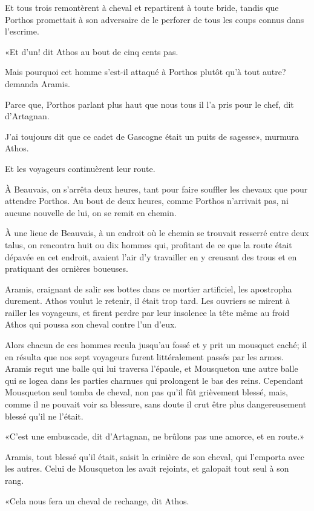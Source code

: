 Et tous trois remontèrent à cheval et repartirent à toute bride, tandis que Porthos promettait à son adversaire de le perforer de tous les coups connus dans l'escrime. 

«Et d'un! dit Athos au bout de cinq cents pas. 

\speak  Mais pourquoi cet homme s'est-il attaqué à Porthos plutôt qu'à tout autre? demanda Aramis. 

\speak  Parce que, Porthos parlant plus haut que nous tous il l'a pris pour le chef, dit d'Artagnan. 

\speak  J'ai toujours dit que ce cadet de Gascogne était un puits de sagesse», murmura Athos. 

Et les voyageurs continuèrent leur route. 

À Beauvais, on s'arrêta deux heures, tant pour faire souffler les chevaux que pour attendre Porthos. Au bout de deux heures, comme Porthos n'arrivait pas, ni aucune nouvelle de lui, on se remit en chemin. 

À une lieue de Beauvais, à un endroit où le chemin se trouvait resserré entre deux talus, on rencontra huit ou dix hommes qui, profitant de ce que la route était dépavée en cet endroit, avaient l'air d'y travailler en y creusant des trous et en pratiquant des ornières boueuses. 

Aramis, craignant de salir ses bottes dans ce mortier artificiel, les apostropha durement. Athos voulut le retenir, il était trop tard. Les ouvriers se mirent à railler les voyageurs, et firent perdre par leur insolence la tête même au froid Athos qui poussa son cheval contre l'un d'eux. 

Alors chacun de ces hommes recula jusqu'au fossé et y prit un mousquet caché; il en résulta que nos sept voyageurs furent littéralement passés par les armes. Aramis reçut une balle qui lui traversa l'épaule, et Mousqueton une autre balle qui se logea dans les parties charnues qui prolongent le bas des reins. Cependant Mousqueton seul tomba de cheval, non pas qu'il fût grièvement blessé, mais, comme il ne pouvait voir sa blessure, sans doute il crut être plus dangereusement blessé qu'il ne l'était. 

«C'est une embuscade, dit d'Artagnan, ne brûlons pas une amorce, et en route.» 

Aramis, tout blessé qu'il était, saisit la crinière de son cheval, qui l'emporta avec les autres. Celui de Mousqueton les avait rejoints, et galopait tout seul à son rang. 

«Cela nous fera un cheval de rechange, dit Athos. 

